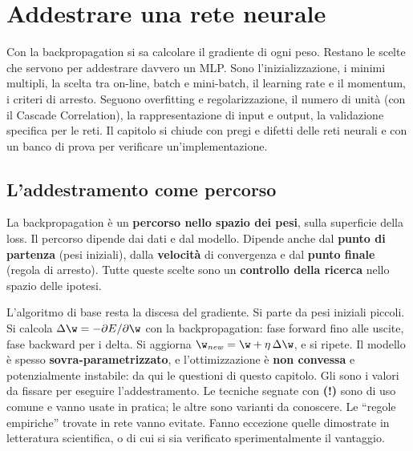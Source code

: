 \chapter{Addestrare una rete neurale}
\label{cap:addestramento}

\begin{inbreve}
Con la backpropagation si sa calcolare il gradiente di ogni peso. Restano le scelte che servono per addestrare
davvero un MLP. Sono l'inizializzazione, i minimi multipli, la scelta tra on-line, batch e mini-batch, il learning
rate e il momentum, i criteri di arresto. Seguono overfitting e regolarizzazione, il numero di unità (con il
Cascade Correlation), la rappresentazione di input e output, la validazione specifica per le reti. Il capitolo si
chiude con pregi e difetti delle reti neurali e con un banco di prova per verificare un'implementazione.
\end{inbreve}

\section{L'addestramento come percorso}

\begin{idea}
La backpropagation è un \textbf{percorso nello spazio dei pesi}, sulla superficie della loss. Il percorso dipende
dai dati e dal modello. Dipende anche dal \textbf{punto di partenza} (pesi iniziali), dalla \textbf{velocità} di
convergenza e dal \textbf{punto finale} (regola di arresto). Tutte queste scelte sono un \textbf{controllo della
ricerca} nello spazio delle ipotesi.
\end{idea}

L'algoritmo di base resta la discesa del gradiente. Si parte da pesi iniziali piccoli. Si calcola
$\Delta\w = -\partial E/\partial\w$ con la backpropagation: fase forward fino alle uscite, fase backward per i
delta. Si aggiorna $\w_{\mathit{new}} = \w+\eta\,\Delta\w$, e si ripete. Il modello è spesso
\textbf{sovra-parametrizzato}, e l'ottimizzazione è \textbf{non convessa} e potenzialmente instabile: da qui le
questioni di questo capitolo. Gli  sono i valori da fissare per eseguire l'addestramento.
Le tecniche segnate con \textbf{(!)} sono di uso comune e vanno usate in pratica; le altre sono varianti da
conoscere. Le ``regole empiriche'' trovate in rete vanno evitate. Fanno eccezione quelle dimostrate in letteratura
scientifica, o di cui si sia verificato sperimentalmente il vantaggio.

